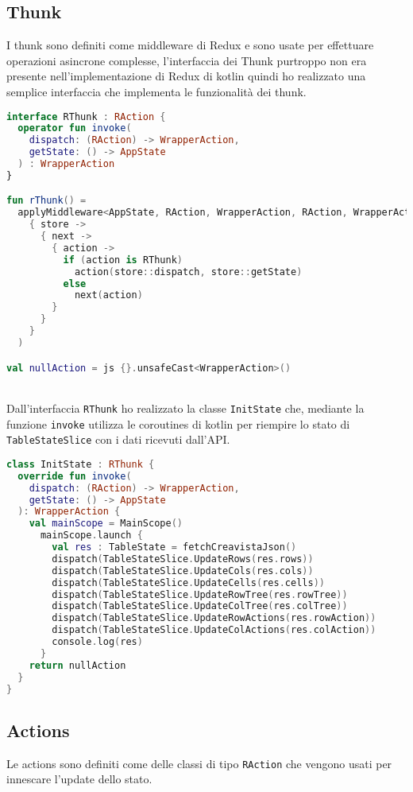 \subsection{Thunk}
I thunk sono definiti come middleware di Redux e sono usate per effettuare operazioni asincrone complesse, l'interfaccia dei Thunk purtroppo non era presente nell'implementazione di Redux di kotlin quindi ho realizzato una semplice interfaccia che implementa le funzionalità dei thunk.
\begin{lstlisting}[caption={BodyCells}, label={lst:bodycells}, language=Kotlin]
interface RThunk : RAction {
  operator fun invoke(
	dispatch: (RAction) -> WrapperAction,
	getState: () -> AppState
  ) : WrapperAction
}

fun rThunk() =
  applyMiddleware<AppState, RAction, WrapperAction, RAction, WrapperAction>(
	{ store ->
	  { next ->
	    { action ->
		  if (action is RThunk)
			action(store::dispatch, store::getState)
		  else
			next(action)
		}
	  }
	}
  )

val nullAction = js {}.unsafeCast<WrapperAction>()
\end{lstlisting}
\noindent \\
Dall'interfaccia \verb|RThunk| ho realizzato la classe \verb|InitState| che, mediante la funzione \verb|invoke| utilizza le coroutines di kotlin per riempire lo stato di \verb|TableStateSlice| con i dati ricevuti dall'API.
\begin{lstlisting}[caption={BodyCells}, label={lst:bodycells}, language=Kotlin]
class InitState : RThunk {
  override fun invoke(
    dispatch: (RAction) -> WrapperAction, 
    getState: () -> AppState
  ): WrapperAction {
    val mainScope = MainScope()
      mainScope.launch {
        val res : TableState = fetchCreavistaJson()
        dispatch(TableStateSlice.UpdateRows(res.rows))
        dispatch(TableStateSlice.UpdateCols(res.cols))
        dispatch(TableStateSlice.UpdateCells(res.cells))
        dispatch(TableStateSlice.UpdateRowTree(res.rowTree))
        dispatch(TableStateSlice.UpdateColTree(res.colTree))
        dispatch(TableStateSlice.UpdateRowActions(res.rowAction))
        dispatch(TableStateSlice.UpdateColActions(res.colAction))
        console.log(res)
      }
    return nullAction
  }
}
\end{lstlisting}

\subsection{Actions}
Le actions sono definiti come delle classi di tipo \verb|RAction| che vengono usati per innescare l'update dello stato.

